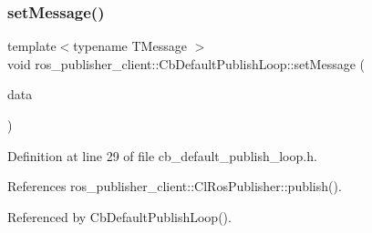 \subsubsection{\texorpdfstring{set\+Message()}{setMessage()}}
{\footnotesize\ttfamily template$<$typename T\+Message $>$ \\
void ros\+\_\+publisher\+\_\+client\+::\+Cb\+Default\+Publish\+Loop\+::set\+Message (\begin{DoxyParamCaption}\item[{const T\+Message \&}]{data }\end{DoxyParamCaption})\hspace{0.3cm}{\ttfamily [inline]}}



Definition at line 29 of file cb\+\_\+default\+\_\+publish\+\_\+loop.\+h.



References ros\+\_\+publisher\+\_\+client\+::\+Cl\+Ros\+Publisher\+::publish().



Referenced by Cb\+Default\+Publish\+Loop().


